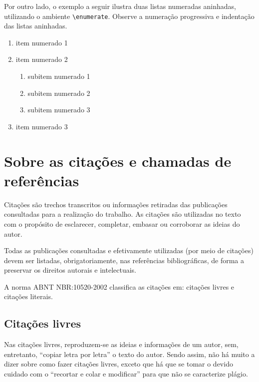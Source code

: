 \begin{apendicesenv}
    Por outro lado, o exemplo a seguir ilustra duas listas numeradas aninhadas, utilizando o ambiente \verb|\enumerate|.
    Observe a numeração progressiva e indentação das listas aninhadas.

    \begin{enumerate}
        \item item numerado 1
        \item item numerado 2
              \begin{enumerate}
                  \item subitem numerado 1
                  \item subitem numerado 2
                  \item subitem numerado 3
              \end{enumerate}
        \item item numerado 3
    \end{enumerate}


    \chapter{Sobre as citações e chamadas de referências}
    \label{chap_sobre_as_citacoes}

    Citações são trechos transcritos ou informações retiradas das publicações consultadas para a realização do trabalho.
    As citações são utilizadas no texto com o propósito de esclarecer, completar, embasar ou corroborar as ideias do autor.

    Todas as publicações consultadas e efetivamente utilizadas (por meio de citações) devem ser listadas, obrigatoriamente, nas referências bibliográficas, de forma a preservar os direitos autorais e intelectuais.

    A norma ABNT NBR:10520-2002 classifica as citações em: citações livres e citações literais.

    \section{Citações livres}
    \label{sec_citacoes_livres}

    Nas citações livres, reproduzem-se as ideias e informações de um autor, sem, entretanto, ``copiar letra por letra'' o texto do autor.
    Sendo assim, não há muito a dizer sobre como fazer citações livres, exceto que há que se tomar o devido cuidado com o ``recortar e colar e modificar'' para que não se caracterize plágio.


\end{apendicesenv}
